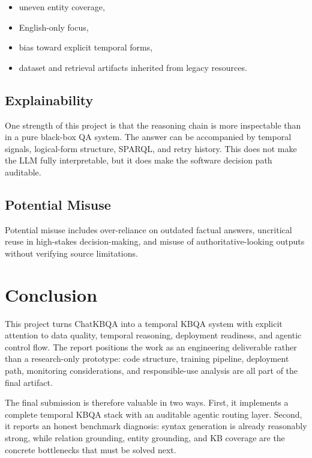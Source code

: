 \documentclass[a4paper,11pt]{article}
\begin{document}
\begin{itemize}[leftmargin=1.2cm]
  \item uneven entity coverage,
  \item English-only focus,
  \item bias toward explicit temporal forms,
  \item dataset and retrieval artifacts inherited from legacy resources.
\end{itemize}

\subsection{Explainability}

One strength of this project is that the reasoning chain is more inspectable than in a pure black-box QA system. The answer can be accompanied by temporal signals, logical-form structure, SPARQL, and retry history. This does not make the LLM fully interpretable, but it does make the software decision path auditable.

\subsection{Potential Misuse}

Potential misuse includes over-reliance on outdated factual answers, uncritical reuse in high-stakes decision-making, and misuse of authoritative-looking outputs without verifying source limitations.

\section{Conclusion}

This project turns ChatKBQA into a temporal KBQA system with explicit attention to data quality, temporal reasoning, deployment readiness, and agentic control flow. The report positions the work as an engineering deliverable rather than a research-only prototype: code structure, training pipeline, deployment path, monitoring considerations, and responsible-use analysis are all part of the final artifact.

The final submission is therefore valuable in two ways. First, it implements a complete temporal KBQA stack with an auditable agentic routing layer. Second, it reports an honest benchmark diagnosis: syntax generation is already reasonably strong, while relation grounding, entity grounding, and KB coverage are the concrete bottlenecks that must be solved next.
\end{document}
